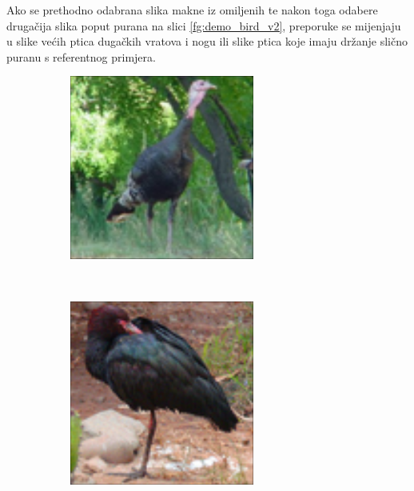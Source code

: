 \documentclass[times, utf8, proizvoljni, numeric]{fer}
\newcommand{\rulesep}{\unskip\ \vrule\ }
\begin{document}
Ako se prethodno odabrana slika makne iz omiljenih te nakon toga odabere drugačija slika poput purana na slici \ref{fg:demo_bird_v2}, preporuke se mijenjaju u slike većih ptica dugačkih vratova i nogu ili slike ptica koje imaju držanje slično puranu s referentnog primjera. 

\begin{figure}[ht!]
	\begin{subfigure}[t]{0.24\textwidth}
		\includegraphics[width=\textwidth,height=\textwidth ]{./imgs/demo-preporucitelja-po-sadrzaju/tijek-rada/id@2.png}
	\end{subfigure}
	\rulesep
	\begin{subfigure}[t]{0.24\textwidth}
		\includegraphics[width=\textwidth,height=\textwidth]{./imgs/demo-preporucitelja-po-sadrzaju/tijek-rada/id@148.png}

\end{subfigure}
\end{figure}
\end{document}
